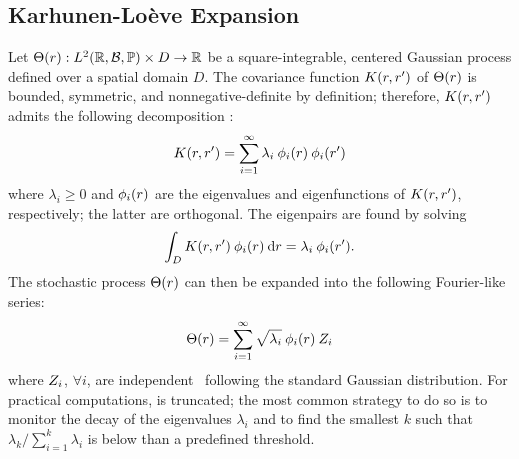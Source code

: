 \subsection{Karhunen-Lo\`{e}ve Expansion}
Let $\Theta(r): L^{2}(\mathbb{R}, \mathcal{B}, \mathbb{P}) \times D \to \mathbb{R}$ be a square-integrable, centered Gaussian process defined over a spatial domain $D$. The covariance function $\fCov{\r, \r'}$ of $\Theta(r)$ is bounded, symmetric, and nonnegative-definite by definition; therefore, $\fCov{\r, \r'}$ admits the following decomposition \cite{maitre2010}:
\[
  \fCov{\r, \r'} = \sum_{i = 1}^\infty \lambda_i \: \klb_i(\r) \: \klb_i(\r')
\]
where $\lambda_i \geq 0$ and $\phi_i(r)$ are the eigenvalues and eigenfunctions of $\fCov{\r, \r'}$, respectively; the latter are orthogonal. The eigenpairs are found by solving
\begin{equation} \elabel{kl-eigenpairs}
  \int_D \fCov{\r, \r'} \: \klb_i (\r) \: \d\r = \lambda_i \: \klb_i(\r').
\end{equation}
The stochastic process $\Theta(r)$ can then be expanded into the following Fourier-like series:
\begin{equation} \elabel{kl-expansion}
  \U(\r) = \sum_{i = 1}^\infty \sqrt{\lambda_i} \: \klb_i(\r) \: \Z_i
\end{equation}
where $Z_i$, $\forall i$, are independent \rvs\ following the standard Gaussian distribution. For practical computations,  is truncated; the most common strategy to do so is to monitor the decay of the eigenvalues $\lambda_i$ and to find the smallest $k$ such that $\lambda_k / \sum_{i = 1}^k \lambda_i$ is below than a predefined threshold.
